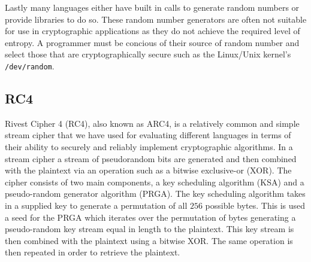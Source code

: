 Lastly many languages either have built in calls to generate random numbers or provide libraries to do so. These random number generators are often not suitable for use 
in cryptographic applications as they do not achieve the required level of entropy. A programmer must be concious of their source of random number and select those that are 
cryptographically secure such as the Linux/Unix kernel's \texttt{/dev/random}.

\subsection{RC4}

Rivest Cipher 4 (RC4), also known as ARC4, is a relatively common and simple stream cipher that we have 
used for evaluating different languages in terms of their ability to securely and reliably implement 
cryptographic algorithms. In a stream cipher a stream of pseudorandom bits are generated and then combined 
with the plaintext via an operation such as a bitwise exclusive-or (XOR). The cipher consists of two main 
components, a key scheduling algorithm (KSA) and a pseudo-random generator algorithm (PRGA). The key scheduling algorithm 
takes in a supplied key to generate a permutation of all $256$ possible bytes. This is used a seed for the 
PRGA which iterates over the permutation of bytes generating a pseudo-random key stream equal in length to 
the plaintext. This key stream is then combined with the plaintext using a bitwise XOR. The same operation is 
then repeated in order to retrieve the plaintext.
